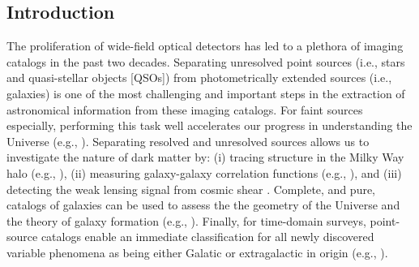 \documentclass[twocolumn]{aastex62}
\begin{document}
\begin{CJK*}{UTF8}{gbsn}


\section{Introduction}\label{sec:intro}

The proliferation of wide-field optical detectors has led to a plethora of
imaging catalogs in the past two decades. Separating unresolved point
sources (i.e., stars and quasi-stellar objects [QSOs]) from photometrically
extended sources (i.e., galaxies) is one of the most challenging and
important steps in the extraction of astronomical information from these
imaging catalogs. For faint sources especially, performing this task well
accelerates our progress in understanding the Universe (e.g.,
\citealt{Sevilla18}). Separating resolved and unresolved sources allows us
to investigate the nature of dark matter by: (i) tracing structure in the
Milky Way halo (e.g., \citealt{Belokurov06}), (ii) measuring galaxy-galaxy
correlation functions (e.g., \citealt{Ross11, Ho15}), and (iii) detecting
the weak lensing signal from cosmic shear \citep{Soumagnac15}. Complete, and
pure, catalogs of galaxies can be used to assess the the geometry of the
Universe \citep{Yasuda01} and the theory of galaxy formation (e.g.,
\citealt{Loveday12, Moorman15}). Finally, for time-domain surveys,
point-source catalogs enable an immediate classification for all newly
discovered variable phenomena as being either Galatic or extragalactic in
origin (e.g., \citealt{Berger12,Miller17}).


\end{CJK*}
\end{document}

